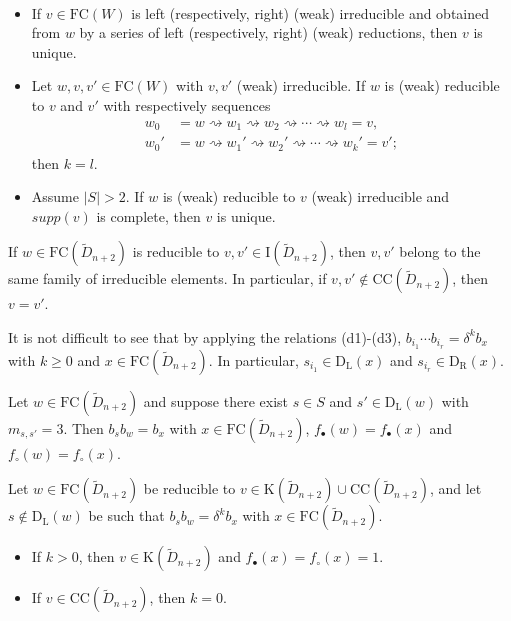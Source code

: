 \documentclass[10pt,a4paper]{amsart}
\newcommand{\D}{{\widetilde{D}_{n+2}}}
\newcommand{\I}{\mathrm{I}}
\newcommand{\TTC}{\mathrm{CC}}
\newcommand{\car}{\mathrm{K}}
\newcommand{\fc}{{\mathrm{FC}}}
\newcommand{\ld}{{\mathrm{D}_{\mathrm{L}}}}
\newcommand{\rd}{{\mathrm{D}_{\mathrm{R}}}}
\newcommand{\red}{\rightsquigarrow}
\begin{document}
\begin{Theorem}\label{theorem:starope}\
    \begin{itemize}    
        \item[(a)] If $v\in \fc(W)$ is left (respectively, right) (weak) irreducible and obtained from $w$ by a series of left (respectively, right) (weak) reductions, then $v$ is unique.
        \item[(b)] Let $w,v,v'\in \fc(W)$ with $v,v'$ (weak) irreducible. If $w$ is (weak) reducible to $v$ and $v'$ with respectively sequences \begin{align} w_0&=w\red w_1\red w_2\red \cdots \red w_l=v, \label{eq:seq1}\\
    w_0'&=w\red w_1'\red w_2'\red \cdots \red w_k'=v' \label{eq:seq2};
    \end{align} then $k=l$. 
        \item[(c)] Assume $|S|>2$. If $w$ is (weak) reducible to $v$ (weak) irreducible and $supp(v)$ is complete, then $v$ is unique. 
    \end{itemize}
\end{Theorem}

\begin{Corollary}
\label{corollary:corclassification}
    If $w\in \fc(\D)$ is reducible to $v,v'\in \I(\D)$, then $v,v'$ belong to the same family of irreducible elements. In particular, if $v,v'\notin \TTC(\D)$, then $v=v'$. 
\end{Corollary}

\begin{Remark}
\label{remark:tlalgebra}
It is not difficult to see that by applying the relations (d1)-(d3), $b_{{i_1}}\cdots b_{{i_r}}=\delta^k b_x$ with $k\ge 0$ and $x\in \fc(\D)$. In particular, $s_{i_1}\in \ld(x)$ and $s_{i_r}\in \rd(x)$.
\end{Remark}

\begin{Lemma}
\label{nuovoprel}
Let $w\in \fc(\D)$ and suppose there exist $s\in S$ and $s'\in \ld(w)$ with $m_{s,s'}=3$. Then $b_sb_w=b_x$ with $x\in \fc(\D)$, $f_\bullet(w)=f_\bullet(x)$ and $f_\circ(w)=f_\circ(x)$.
\end{Lemma}

\begin{Proposition}
\label{nuovodue}
Let $w\in \fc(\D)$ be reducible to $v\in \car(\D)\cup \TTC(\D)$, and let $s\notin \ld(w)$ be such that $b_sb_w=\delta ^kb_{x}$ with $x\in \fc(\D)$. 
\begin{itemize}
    \item[(a)] If $k>0$, then $v\in \car(\D)$ and $f_\bullet(x)=f_\circ(x)=1$.
    \item[(b)] If $v\in \TTC(\D)$, then $k=0$.
\end{itemize}
\end{Proposition}
\end{document}
